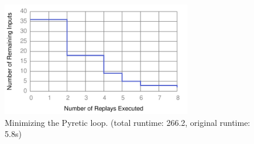 \begin{figure}[t]
    \includegraphics[width=3.25in]{../graphs/runtime/pyretic_loop.pdf}
    \caption[]{\label{fig:pyretic_loop} Minimizing the Pyretic loop. (total
    runtime: 266.2, original runtime: 5.8s)}
\end{figure}


